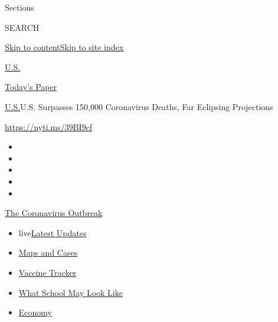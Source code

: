 Sections

SEARCH

\protect\hyperlink{site-content}{Skip to
content}\protect\hyperlink{site-index}{Skip to site index}

\href{https://www.nytimes.com/section/us}{U.S.}

\href{https://myaccount.nytimes.com/auth/login?response_type=cookie\&client_id=vi}{}

\href{https://www.nytimes.com/section/todayspaper}{Today's Paper}

\href{/section/us}{U.S.}\textbar{}U.S. Surpasses 150,000 Coronavirus
Deaths, Far Eclipsing Projections

\url{https://nyti.ms/39BI9cf}

\begin{itemize}
\item
\item
\item
\item
\item
\end{itemize}

\href{https://www.nytimes.com/news-event/coronavirus?action=click\&pgtype=Article\&state=default\&region=TOP_BANNER\&context=storylines_menu}{The
Coronavirus Outbreak}

\begin{itemize}
\tightlist
\item
  live\href{https://www.nytimes.com/2020/08/01/world/coronavirus-covid-19.html?action=click\&pgtype=Article\&state=default\&region=TOP_BANNER\&context=storylines_menu}{Latest
  Updates}
\item
  \href{https://www.nytimes.com/interactive/2020/us/coronavirus-us-cases.html?action=click\&pgtype=Article\&state=default\&region=TOP_BANNER\&context=storylines_menu}{Maps
  and Cases}
\item
  \href{https://www.nytimes.com/interactive/2020/science/coronavirus-vaccine-tracker.html?action=click\&pgtype=Article\&state=default\&region=TOP_BANNER\&context=storylines_menu}{Vaccine
  Tracker}
\item
  \href{https://www.nytimes.com/interactive/2020/07/29/us/schools-reopening-coronavirus.html?action=click\&pgtype=Article\&state=default\&region=TOP_BANNER\&context=storylines_menu}{What
  School May Look Like}
\item
  \href{https://www.nytimes.com/live/2020/07/31/business/stock-market-today-coronavirus?action=click\&pgtype=Article\&state=default\&region=TOP_BANNER\&context=storylines_menu}{Economy}
\end{itemize}

